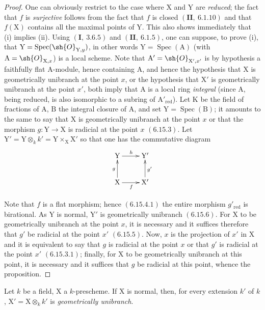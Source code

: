 \begin{proof}
One can obviously restrict to the case where $\mathrm{X}$ and $\mathrm{Y}$ are \emph{reduced}; the fact that $f$ is
\emph{surjective} follows from the fact that $f$ is closed $(\mathbf{II},~6.1.10)$ and that $f(\mathrm{X})$ contains
all the maximal points of $\mathrm{Y}$. This also shows immediately that (i) implies (ii).
Using $(\mathbf{I},~3.6.5)$ and $(\mathbf{II},~6.1.5)$, one can suppose, to prove (i), that $\mathrm{Y}=\operatorname{Spec}(\sh{O}_{\mathrm{Y},y})$,
in other words $\mathrm{Y}=\operatorname{Spec}(\mathrm{A})$ (with $\mathrm{A}=\sh{O}_{\mathrm{X},x}$) is a local scheme. Note that $\mathrm{A}'=\sh{O}_{\mathrm{X}',x'}$
is by hypothesis a faithfully flat $\mathrm{A}$-module, hence containing $\mathrm{A}$, and hence
the hypothesis that $\mathrm{X}$ is geometrically unibranch at the point $x$, or the hypothesis that $\mathrm{X}'$ is
geometrically unibranch at the point $x'$, both imply that $\mathrm{A}$ is a local ring
\emph{integral} (since $\mathrm{A}$, being reduced, is also isomorphic to a subring of $\mathrm{A}'_{\mathrm{red}}$).
Let $\mathrm{K}$ be the field of fractions of $\mathrm{A}$, $\mathrm{B}$ the integral closure of $\mathrm{A}$, and set $\mathrm{Y}=\operatorname{Spec}(\mathrm{B})$;
it amounts to the same to say that $\mathrm{X}$ is geometrically unibranch at the point $x$ or that
the morphism $g:\mathrm{Y}\to\mathrm{X}$ is radicial at the point $x$ $(6.15.3)$. Let $\mathrm{Y}'=\mathrm{Y}\otimes_k k'=\mathrm{Y}\times_\mathrm{X}\mathrm{X}'$
so that one has the commutative diagram
\[
\xymatrix{
  \mathrm{Y} \ar[r]^{h} & \mathrm{Y}' \\
  \mathrm{X} \ar[u]^{g} \ar[r]_{f} & \mathrm{X}' \ar[u]_{g'}
}
\]

Note that $f$ is a flat morphism; hence $(6.15.4.1)$ the entire morphism $g'_{\mathrm{red}}$ is
birational. As $\mathrm{Y}$ is normal, $\mathrm{Y}'$ is geometrically unibranch
$(6.15.6)$. For $\mathrm{X}$ to be geometrically unibranch at the point $x$, it is necessary and it suffices therefore
that $g'$ be radicial at the point $x'$ $(6.15.5)$. Now, $x$ is the projection of $x'$ in $\mathrm{X}$ and it is
equivalent to say that $g$ is radicial at the point $x$ or that $g'$ is radicial at the point $x'$
$(6.15.3.1)$; finally, for $\mathrm{X}$ to be geometrically unibranch at this point, it is necessary and it
suffices that $g$ be radicial at this point, whence the proposition.
\end{proof}

\begin{proposition}[6.15.6]
\label{IV.6.15.6}
Let $k$ be a field, $\mathrm{X}$ a $k$-prescheme. If $\mathrm{X}$ is normal, then,
for every extension $k'$ of $k$, $\mathrm{X}'=\mathrm{X}\otimes_k k'$ is \emph{geometrically unibranch}.
\end{proposition}


